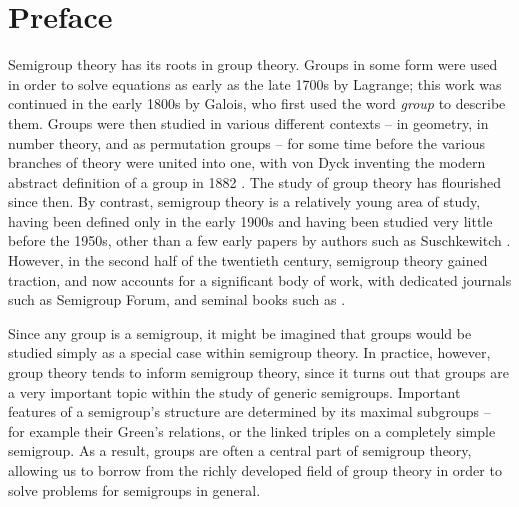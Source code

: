 \chapter*{Preface}

Semigroup theory has its roots in group theory.  Groups in some form were used
in order to solve equations as early as the late 1700s by Lagrange; this work
was continued in the early 1800s by Galois, who first used the word
\textit{group} to describe them.  Groups were then studied in various different
contexts -- in geometry, in number theory, and as permutation groups -- for some
time before the various branches of theory were united into one, with von Dyck
inventing the modern abstract definition of a group in 1882 \cite{dyck_1882}.
The study of group theory has flourished since then.  By contrast, semigroup
theory is a relatively young area of study, having been defined only in the
early 1900s and having been studied very little before the 1950s, other than a
few early papers by authors such as Suschkewitch \cite{susch_1928}.  However, in
the second half of the twentieth century, semigroup theory gained traction, and
now accounts for a significant body of work, with dedicated journals such as
Semigroup Forum, and seminal books such as \cite{howie, petrich}.

Since any group is a semigroup, it might be imagined that groups would be
studied simply as a special case within semigroup theory.  In practice, however,
group theory tends to inform semigroup theory, since it turns out that groups
are a very important topic within the study of generic semigroups.  Important
features of a semigroup's structure are determined by its maximal subgroups --
for example their Green's relations, or the linked triples on a completely
simple semigroup.  As a result, groups are often a central part of semigroup
theory, allowing us to borrow from the richly developed field of group theory in
order to solve problems for semigroups in general.

